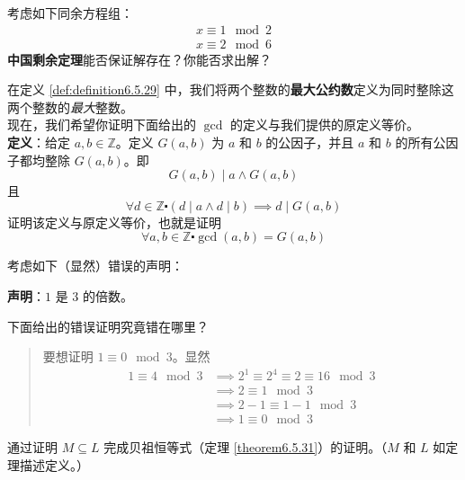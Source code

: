 \begin{exercise}
    考虑如下同余方程组：
    \begin{align*}
        x \equiv 1 \mod 2\\
        x \equiv 2 \mod 6
    \end{align*}
    \textbf{中国剩余定理}能否保证解存在？你能否求出解？
\end{exercise}

\begin{exercise}
    在定义 \ref{def:definition6.5.29} 中，我们将两个整数的\textbf{最大公约数}定义为同时整除这两个整数的\emph{最大}整数。\\
    现在，我们希望你证明下面给出的 $\gcd$ 的定义与我们提供的原定义等价。\\
    \textbf{定义}：给定 $a, b \in \mathbb{Z}$。定义 $G(a,b)$ 为 $a$ 和 $b$ 的公因子，并且 $a$ 和 $b$ 的所有公因子都均整除 $G(a, b)$。即
    \[G(a, b) \mid a \land G(a, b)\]
    且
    \[\forall d \in \mathbb{Z} \centerdot (d \mid a \land d \mid b) \implies d \mid G(a,b)\]
    证明该定义与原定义等价，也就是证明
    \[\forall a, b \in \mathbb{Z} \centerdot \gcd(a, b) = G(a, b)\]
\end{exercise}

\begin{exercise}
    考虑如下（显然）错误的声明：

    \textbf{声明}：$1$ 是 $3$ 的倍数。

    下面给出的错误证明究竟错在哪里？

    \begin{quote}
        要想证明 $1 \equiv 0 \mod 3$。显然
        \begin{align*}
            1 \equiv 4 \mod 3& \implies 2^1 \equiv 2^4 \equiv 2 \equiv 16 \mod 3\\
            & \implies 2 \equiv 1 \mod 3\\
            & \implies 2 - 1 \equiv 1 - 1 \mod 3\\
            & \implies 1 \equiv 0 \mod 3
        \end{align*}
    \end{quote}
\end{exercise}

\begin{exercise}\label{exc:exercises6.7.12}
    通过证明 $M \subseteq L$ 完成贝祖恒等式（定理 \ref{theorem6.5.31}）的证明。（$M$ 和 $L$ 如定理描述定义。）
\end{exercise}

